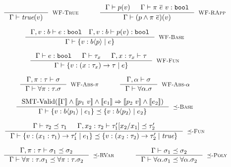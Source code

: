 \begin{figure}[ht!]

$$\begin{array}{ccc}
\inference
  {}
  {\isWellFormed{\Gamma}{\true(\vref)}}
  [\wtTrue]
&
\quad
&
\inference
    {\isWellFormed{\Gamma}{\areft(\vref)} && 
     \hastype{\Gamma}{\rvapp{\rvar}{e} \ \vref}{\tbbool}
    }
    {\isWellFormed{\Gamma}{(\areft \wedge \rvapp{\rvar}{e})(\vref)}}
    [\wtRVApp]
\end{array}$$

$$\inference
    {\hastype{\Gamma, \vref:b}{\reft}{\tbbool} \quad 
     \hastype{\Gamma, \vref:b}{\areft(\vref)}{\tbbool}
    }
    {\isWellFormed{\Gamma}{\tpref{b}{\areft}{\reft}}}
    [\wtBase]
$$

$$
\inference
    {
	\hastype{\Gamma}{\reft}{\tbbool} &&
    \isWellFormed{\Gamma}{\tau_x} &&
	\isWellFormed{\Gamma, x:\tau_x}{\tau}
    }
    {\isWellFormed{\Gamma}{\trfun{x}{\tau_x}{\tau}{\reft}}}
    [\wtFun]
$$

$$\begin{array}{ccc}
\inference
  {\isWellFormed{\Gamma, \rvar:\tau}{\sigma}}
  {\isWellFormed{\Gamma}{\tpabs{\rvar}{\tau}{\sigma}}}
  [\wtPred]
&
\quad
&
\inference
    {\isWellFormed{\Gamma, \alpha}{\sigma}}
    {\isWellFormed{\Gamma}{\ttabs{\alpha}{\sigma}}}
    [\wtPoly]
\end{array}$$

\medskip {}

$$
\inference
   {\text{SMT-Valid}(\inter{\Gamma} \land \inter{\areft_1\ \vref} \land \inter{\reft_1} 
                 \Rightarrow \inter{\areft_2\ \vref} \land \inter{\reft_2})}
   {\isSubType{\Gamma}{\tpref{b}{\areft_1}{\reft_1}}{\tpref{b}{\areft_2}{\reft_2}}}
   [\tsubBase]
$$

$$
\inference
   {%
	\isSubType{\Gamma}{\tau_2}{\tau_1} &
	\isSubType{\Gamma, x_2:{\tau_2}}{\SUBST{\tau_1'}{x_1}{x_2}}{\tau_2'}	
   }
   {\isSubType{\Gamma}
	  {\trfun{x_1}{\tau_1}{\tau_1'}{\reft_1}}
	  {\trfun{x_2}{\tau_2}{\tau_2'}{\true}}
}[\tsubFun]
$$


$$
\begin{array}{ccc}
\inference
   {\isSubType{\Gamma, \rvar:\tau}{\sigma_1}{\sigma_2}}
   {\isSubType{\Gamma}{\tpabs{\rvar}{\tau}{\sigma_1}}{\tpabs{\rvar}{\tau}{\sigma_2}}}
   [\tsubPred]
&
\quad
&
\inference
   {\isSubType{\Gamma}{\sigma_1}{\sigma_2}}
   {\isSubType{\Gamma}{\ttabs{\alpha}{\sigma_1}}{\ttabs{\alpha}{\sigma_2}}}
   [\tsubPoly]
\end{array}
$$


\end{figure}
